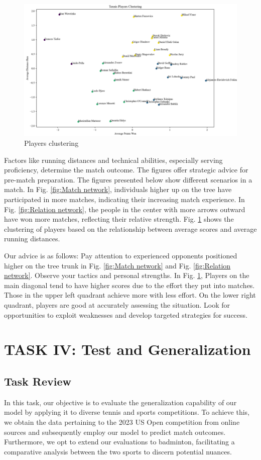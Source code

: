 \documentclass{mcmthesis}
\begin{document}
\begin{figure}[ht]
\begin{minipage}{0.32\textwidth}
        \includegraphics[width=\textwidth]{figures/clustering.png}
        \caption{Players clustering}
        \label{fig:Players clustering}
    \end{minipage}
\end{figure}
Factors like running distances and technical abilities, especially serving proficiency, determine the match outcome. The figures offer strategic advice for pre-match preparation. The figures presented below show different scenarios in a match. In Fig. \ref{fig:Match network}, individuals higher up on the tree have participated in more matches, indicating their increasing match experience. In Fig. \ref{fig:Relation network}, the people in the center with more arrows outward have won more matches, reflecting their relative strength. Fig. \ref{fig:Players clustering} shows the clustering of players based on the relationship between average scores and average running distances.

Our advice is as follows: Pay attention to experienced opponents positioned higher on the tree trunk in Fig. \ref{fig:Match network} and Fig. \ref{fig:Relation network}. Observe your tactics and personal strengths. In Fig. \ref{fig:Players clustering}, Players on the main diagonal tend to have higher scores due to the effort they put into matches. Those in the upper left quadrant achieve more with less effort. On the lower right quadrant, players are good at accurately assessing the situation. Look for opportunities to exploit weaknesses and develop targeted strategies for success.

\section{TASK IV: Test and Generalization}
\subsection{Task Review}
In this task, our objective is to evaluate the generalization capability of our model by applying it to diverse tennis and sports competitions. To achieve this, we obtain the data pertaining to the 2023 US Open competition from online sources and subsequently employ our model to predict match outcomes. Furthermore, we opt to extend our evaluations to badminton, facilitating a comparative analysis between the two sports to discern potential nuances.
\end{document}
